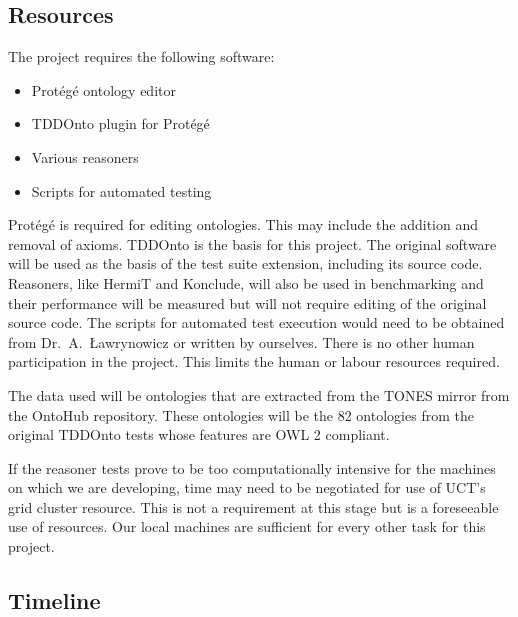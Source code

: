 \documentclass[draft]{sig-alternate}
\begin{document}
\subsection{Resources}

The project requires the following software:
\begin{itemize}[noitemsep]
  \item Prot\'eg\'e ontology editor
  \item TDDOnto plugin for Prot\'eg\'e
  \item Various reasoners
  \item Scripts for automated testing
\end{itemize}

Prot\'eg\'e is required for editing ontologies. This may include the addition and removal of axioms. TDDOnto is the basis for this project. The original software will be used as the basis of the test suite extension, including its source code. Reasoners, like HermiT and Konclude, will also be used in benchmarking and their performance will be measured but will not require editing of the original source code. The scripts for automated test execution would need to be obtained from Dr.\ A.\ {\L}awrynowicz or written by ourselves. There is no other human participation in the project. This limits the human or labour resources required.

The data used will be ontologies that are extracted from the TONES mirror from the OntoHub repository. These ontologies will be the 82 ontologies from the original TDDOnto tests whose features are OWL 2 compliant.

If the reasoner tests prove to be too computationally intensive for the machines on which we are developing, time may need to be negotiated for use of UCT's grid cluster resource. This is not a requirement at this stage but is a foreseeable use of resources. Our local machines are sufficient for every other task for this project.

\subsection{Timeline}
\end{document}
